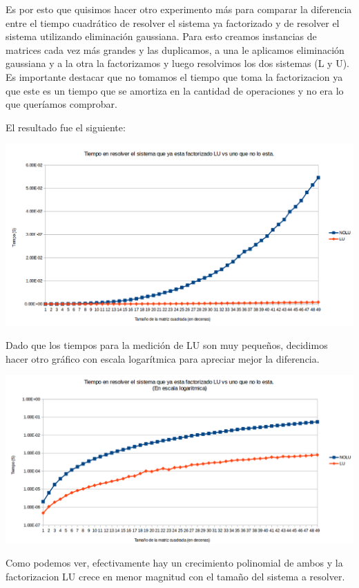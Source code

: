 Es por esto que quisimos hacer otro experimento más para comparar la diferencia entre el tiempo cuadrático de resolver el sistema ya factorizado y de resolver el sistema utilizando eliminación gaussiana.
Para esto creamos instancias de matrices cada vez más grandes y las duplicamos, a una le aplicamos eliminación gaussiana y a la otra la factorizamos y luego resolvimos los dos sistemas (L y U). Es importante destacar que no tomamos el tiempo que toma la factorizacion ya que este es un tiempo que se amortiza en la cantidad de operaciones y no era lo que queríamos comprobar.

El resultado fue el siguiente:

{\centering
    \includegraphics[scale=0.6]{informe/imagenes/LUVSNOLUDIM.PNG} \\
}

Dado que los tiempos para la medición de LU son muy pequeños, decidimos hacer otro gráfico con escala logarítmica para apreciar mejor la diferencia.


{\centering
    \includegraphics[scale=0.6]{informe/imagenes/LUVSNOLUDIMLOG.PNG} \\
}

Como podemos ver, efectivamente hay un crecimiento polinomial de ambos y la factorizacion LU crece en menor magnitud con el tamaño del sistema a resolver.

